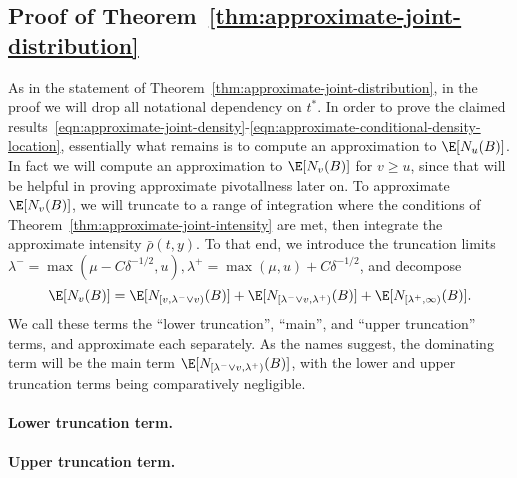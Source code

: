 \documentclass{article}
\newcommand{\ag}[1]{{\bf{{\red{[{AG: #1}]}}}}}
\begin{document}
	\subsection{Proof of Theorem~\ref{thm:approximate-joint-distribution}}
	As in the statement of Theorem~\ref{thm:approximate-joint-distribution}, in the proof we will drop all notational dependency on $t^*$. In order to prove the claimed results~\eqref{eqn:approximate-joint-density}-\eqref{eqn:approximate-conditional-density-location}, essentially what remains is to compute an approximation to $\E[N_u(B)]$. In fact we will compute an approximation to $\E[N_v(B)]$ for $v \geq u$, since that will be helpful in proving approximate pivotallness later on. To approximate $\E[N_v(B)]$, we will truncate to a range of integration where the conditions of Theorem~\ref{thm:approximate-joint-intensity} are met, then integrate the approximate intensity $\bar{\rho}(t,y)$. To that end, we introduce the truncation limits $\lambda^{-} = \max(\mu - C\delta^{-1/2}, u), \lambda^{+} = \max(\mu,u) + C\delta^{-1/2}$, and decompose
	\begin{equation*}
		\E[N_v(B)] = \E[N_{[v,\lambda^{-} \vee v)}(B)] + \E[N_{[\lambda^{-} \vee v, \lambda^{+})}(B)] + \E[N_{[\lambda^{+},\infty)}(B)].
	\end{equation*}
	We call these terms the ``lower truncation'', ``main'', and ``upper truncation'' terms, and approximate each separately. As the names suggest, the dominating term will be the main term $\E[N_{[\lambda^{-} \vee v, \lambda^{+})}(B)]$, with the lower and upper truncation terms being comparatively negligible.
	
	\paragraph{Lower truncation term.}
	\ag{TO COME}
	
	\paragraph{Upper truncation term.}
	\ag{TO COME}
	
\end{document}

